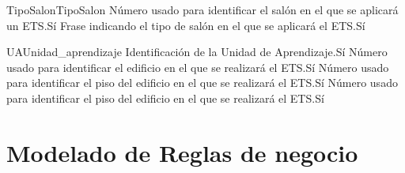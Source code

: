 \begin{cdtEntidad}{TipoSalon}{TipoSalon}
	{Número usado para identificar el salón en el que se aplicará un ETS.}{Sí}
	{Frase indicando el tipo de salón en el que se aplicará el ETS.}{Sí}
\end{cdtEntidad}
\begin{cdtEntidad}{UA}{Unidad\_aprendizaje}
	{Identificación de la Unidad de Aprendizaje.}{Sí}
	{Número usado para identificar el edificio en el que se realizará el ETS.}{Sí}
	{Número usado para identificar el piso del edificio en el que se realizará el ETS.}{Sí}
	{Número usado para identificar el piso del edificio en el que se realizará el ETS.}{Sí}
	\cdtEntityRelSection
\end{cdtEntidad}
\section{Modelado de Reglas de negocio}



